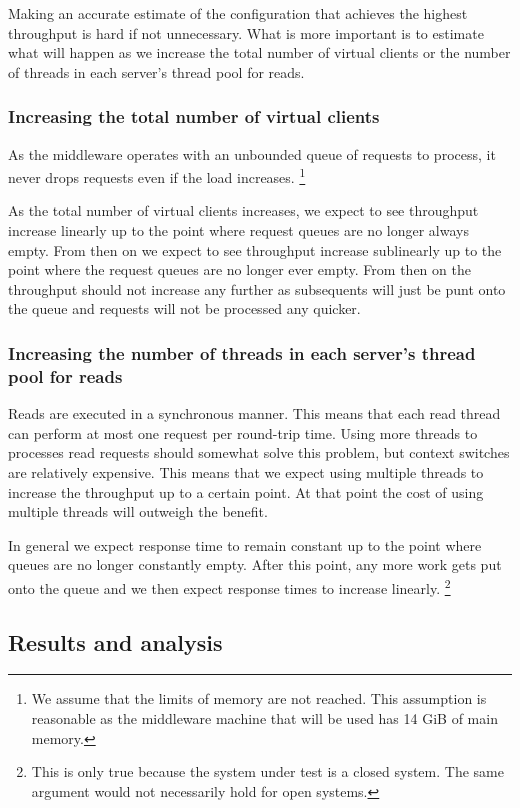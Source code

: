 \documentclass[11pt]{article}
\begin{document}
Making an accurate estimate of the configuration that achieves the highest throughput is hard if not unnecessary.
What is more important is to estimate what will happen as we increase the total number of virtual clients or the number of threads in each server's thread pool for reads.

\subsubsection{Increasing the total number of virtual clients}

As the middleware operates with an unbounded queue of requests to process, it never drops requests even if the load increases.
\footnote{
  We assume that the limits of memory are not reached.
  This assumption is reasonable as the middleware machine that will be used has 14 GiB of main memory.
}

As the total number of virtual clients increases, we expect to see throughput increase linearly up to the point where request queues are no longer always empty.
From then on we expect to see throughput increase sublinearly up to the point where the request queues are no longer ever empty.
From then on the throughput should not increase any further as subsequents will just be punt onto the queue and requests will not be processed any quicker.

\subsubsection{Increasing the number of threads in each server's thread pool for reads}

Reads are executed in a synchronous manner.
This means that each read thread can perform at most one request per round-trip time.
Using more threads to processes read requests should somewhat solve this problem, but context switches are relatively expensive.
This means that we expect using multiple threads to increase the throughput up to a certain point.
At that point the cost of using multiple threads will outweigh the benefit.

In general we expect response time to remain constant up to the point where queues are no longer constantly empty.
After this point, any more work gets put onto the queue and we then expect response times to increase linearly.
\footnote{
  This is only true because the system under test is a closed system.
  The same argument would not necessarily hold for open systems.
}

\subsection{Results and analysis}
\end{document}
